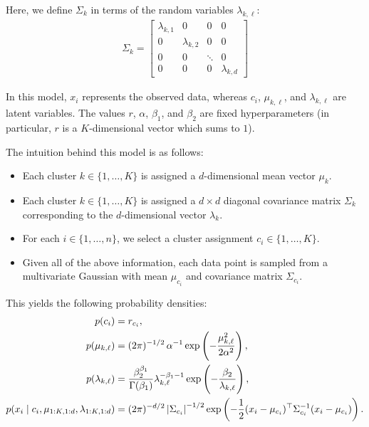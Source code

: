 \documentclass[11pt]{article}
\begin{document}
Here, we define $\Sigma_k$ in terms of the random variables $\lambda_{k,\ell}$:
\begin{align}
\Sigma_k
= \begin{bmatrix}
    \lambda_{k, 1} & 0 & 0 & 0 \\
    0 & \lambda_{k, 2} & 0 & 0 \\
    0 & 0 & \ddots & 0 \\
    0 & 0 & 0 & \lambda_{k, d}
  \end{bmatrix}
\end{align}

In this model, $x_i$ represents the observed data, whereas $c_i$, $\mu_{k, \ell}$, and $\lambda_{k,\ell}$ are latent variables.
The values $r$, $\alpha$, $\beta_1$, and $\beta_2$ are fixed hyperparameters (in particular, $r$ is a $K$-dimensional vector which sums to $1$).

The intuition behind this model is as follows:
\begin{itemize}
    \item Each cluster $k \in \{1, \ldots, K\}$ is assigned a $d$-dimensional mean vector $\mu_k$.
    \item Each cluster $k \in \{1, \ldots, K\}$ is assigned a $d \times d$ diagonal covariance matrix $\Sigma_k$ corresponding to the $d$-dimensional vector $\lambda_k$.
    \item For each $i \in \{1, \ldots, n\}$, we select a cluster assignment $c_i \in \{1, \ldots, K\}$.
    \item Given all of the above information, each data point is sampled from a multivariate Gaussian with mean $\mu_{c_i}$ and covariance matrix $\Sigma_{c_i}$.
\end{itemize}

This yields the following probability densities:
\begin{align}
p(c_i) &= r_{c_i}, \\
p(\mu_{k, \ell}) &= (2\pi)^{-1/2} \, \alpha^{-1} \exp\left( -\frac{\mu_{k, \ell}^2}{2 \alpha^2} \right), \\
p(\lambda_{k,\ell}) &= \frac{\beta_2^{\beta_1}}{\Gamma(\beta_1)} \lambda_{k,\ell}^{-\beta_1 - 1} \exp\left( -\frac{\beta_2}{\lambda_{k,\ell}} \right), \\
p(x_i \mid c_i, \mu_{1:K,1:d}, \lambda_{1:K,1:d}) &= (2\pi)^{-d/2} \, \abs{\Sigma_{c_i}}^{-1/2} \exp \left( -\frac{1}{2} (x_i - \mu_{c_i})^\top \Sigma_{c_i}^{-1} (x_i - \mu_{c_i}) \right).
\end{align}
\end{document}
